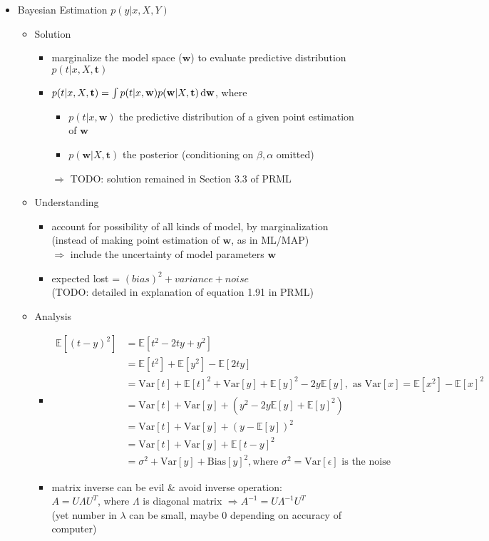 \begin{itemize}
\item Bayesian Estimation $p(y|x,X,Y)$ 
	\begin{itemize}
	\item Solution
		\begin{itemize}
		\item marginalize the model space ($\mathbf w$) to evaluate predictive distribution $p(t|x, X, \mathbf t)$
		\item $p(t|x, X, \mathbf t) = \int p(t|x,\mathbf w)p(\mathbf w|X, \mathbf t) \mathop{}\!\mathrm{d} \mathbf w$, where
			\begin{itemize}
			\item $p(t|x,\mathbf w)$ the predictive distribution of a given point estimation of $\mathbf w$
			\item $p(\mathbf w | X, \mathbf t)$ the posterior (conditioning on $\beta, \alpha$ omitted)
			\end{itemize}
		$\Rightarrow$ TODO: solution remained in Section 3.3 of PRML
		\end{itemize}
	\item Understanding
		\begin{itemize}
		\item account for possibility of all kinds of model, by marginalization \\
		(instead of making point estimation of $\mathbf w$, as in ML/MAP) \\
		$\Rightarrow$ include the uncertainty of model parameters $\mathbf w$
		\item expected lost = $(bias)^2 + variance + noise$ \\
		(TODO: detailed in explanation of equation 1.91 in PRML)
		\end{itemize}
	\item Analysis
		\begin{itemize}
		\item \begin{align*} \mathbb E[(t- y)^2] &= \mathbb E[t^2-2ty+y^2] \\
		&= \mathbb E[t^2] +\mathbb E[y^2] -\mathbb E[2ty] \\
		&= \text{Var}[t]+\mathbb E[t]^2 + \text{Var}[y]+\mathbb E [y]^2 - 2y\mathbb E[y], \text{ as } \text{Var}[x] = \mathbb E[x^2] - \mathbb E[x]^2 \\
		&= \text{Var}[t] + \text{Var}[y] + (y^2 -2y\mathbb E[y] +\mathbb E[y]^2) \\
		&= \text{Var}[t] + \text{Var}[y] + (y-\mathbb E[y])^2 \\
		&= \text{Var}[t] + \text{Var}[y] + \mathbb E[t-y]^2 \\
		&= \sigma^2+\text{Var}[y] + \text{Bias}[y]^2, \text{where } \sigma^2 = \text{Var}[\epsilon] \text{ is the noise}
		\end{align*}
		\item matrix inverse can be evil \& avoid inverse operation: \\	
		$A = U\Lambda U^T$, where $\Lambda$ is diagonal matrix $\Rightarrow A^{-1} = U\Lambda^{-1}U^T$ \\
		(yet number in $\lambda$ can be small, maybe 0 depending on accuracy of computer)
		\end{itemize}
	\end{itemize}


\end{itemize}
